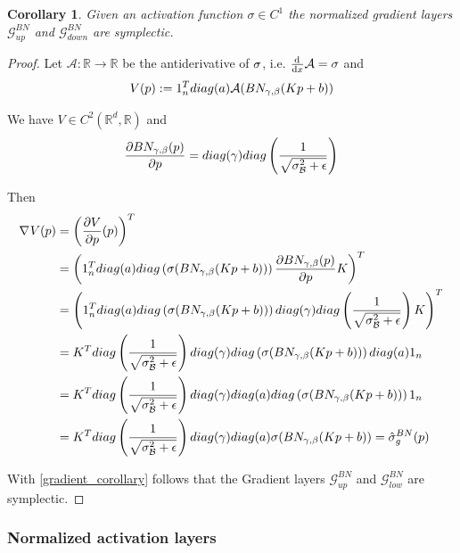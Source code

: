 \documentclass[twoside,a4paper]{article}
\newtheorem{corollary}{Corollary}
\begin{document}
\begin{corollary}
	Given an activation function $\sigma \in C^1$
	the normalized gradient layers $\mathcal{G}^{BN}_{up}$ and $\mathcal{G}^{BN}_{down}$
	are symplectic.
\end{corollary}
\begin{proof}
	Let $\mathcal{A}: \mathbb{R} \to \mathbb{R}$ be the antiderivative of $\sigma$, 
	i.e. $\frac{\mathrm{d}^{}}{\mathrm{d}x} \mathcal{A} = \sigma$ and
	\begin{equation*}
		V(p) := 1_{n}^Tdiag(a)\mathcal{A}(BN_{\gamma, \beta}(Kp+b))
	\end{equation*}

	We have $V \in C^2(\mathbb{R}^d, \mathbb{R})$ and
	\begin{equation*}
		\frac{\partial BN_{\gamma, \beta}(p)}{\partial p} = 
		diag(\gamma)diag\left( \frac{1}{\sqrt{\sigma^2_\mathcal{B} + \epsilon}} \right)
	\end{equation*}

	Then
	\begin{align*}
		\nabla_{}{V(p)} &= \left(\frac{\partial V}{\partial p}(p)\right)^T \\
		&= \left( 1_n^T diag(a) diag \left( \sigma(BN_{\gamma, \beta}(Kp+b))\right)
		\frac{\partial BN_{\gamma, \beta}(p)}{\partial p} K \right)^T \\
		&= \left( 1_n^T diag(a) diag \left( \sigma(BN_{\gamma, \beta}(Kp+b))\right)
		diag(\gamma) diag\left( \frac{1}{\sqrt{\sigma^2_\mathcal{B} + \epsilon}} \right) K \right)^T \\
		&= K^T diag\left( \frac{1}{\sqrt{\sigma^2_\mathcal{B} + \epsilon}} \right) diag(\gamma)
		diag\left(\sigma(BN_{\gamma, \beta}(Kp+b))\right) diag(a) 1_n \\
		&= K^T diag\left( \frac{1}{\sqrt{\sigma^2_\mathcal{B} + \epsilon}} \right) diag(\gamma)
		diag(a) diag\left(\sigma(BN_{\gamma, \beta}(Kp+b))\right) 1_n \\
		&= K^T diag\left( \frac{1}{\sqrt{\sigma^2_\mathcal{B} + \epsilon}} \right) diag(\gamma)
		diag(a) \sigma(BN_{\gamma, \beta}(Kp+b)) = \hat{\sigma}^{BN}_g(p)
	\end{align*}

	With \cref{gradient_corollary} follows that the Gradient layers
	$\mathcal{G}^{BN}_{up}$ and $\mathcal{G}^{BN}_{low}$ are symplectic.
\end{proof}

\subsubsection{Normalized activation layers}
\end{document}
